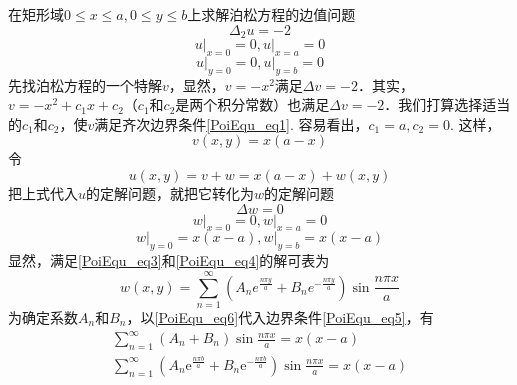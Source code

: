 \begin{example}{}
    在矩形域$0\leq x\leq a, 0\leq y\leq b$上求解泊松方程的边值问题
    \begin{equation}
        \Delta_{2} u=-2
    \end{equation}
    \begin{equation} \label{PoiEqu_eq1}
        \left.u\right|_{x=0}=0,\left.u\right|_{x=a}=0
    \end{equation}
    \begin{equation}\label{PoiEqu_eq2}
        \left.u\right|_{y=0}=0,\left.u\right|_{y=b}=0
    \end{equation}
    先找泊松方程的一个特解$v$，显然，$v=-x^2$满足$\Delta v =-2$．其实，$v=-x^2+c_1x+c_2$（$c_1$和$c_2$是两个积分常数）也满足$\Delta v = -2$．我们打算选择适当的$c_1$和$c_2$，使$v$满足齐次边界条件\autoref{PoiEqu_eq1}. 容易看出，$c_1=a,c_2 = 0$.
    这样，
    \begin{equation}
        v(x,y) = x(a-x)
    \end{equation}
    令
    \begin{equation}
        u(x,y)=v+w=x(a-x)+w(x,y)
    \end{equation}
    把上式代入$u$的定解问题，就把它转化为$w $的定解问题
    \begin{equation} \label{PoiEqu_eq3}
        \Delta w =0
    \end{equation}
    \begin{equation} \label{PoiEqu_eq4}
        \left.w\right|_{x=0}=0,\left.w\right|_{x=a}=0
    \end{equation}
    \begin{equation} \label{PoiEqu_eq5}
        \left.w\right|_{y=0}=x(x-a),\left.w\right|_{y=b}=x(x-a)
    \end{equation}
    显然，满足\autoref{PoiEqu_eq3}和\autoref{PoiEqu_eq4}的解可表为
    \begin{equation} \label{PoiEqu_eq6}
        w(x, y)=\sum_{n=1}^{\infty}\left(A_{n} e^{\frac{n \pi y}{a}}+B_{n} e^{-\frac{n \pi y}{a}}\right) \sin \frac{n \pi x}{a}
    \end{equation}
    为确定系数$A_n$和$B_n$，以\autoref{PoiEqu_eq6}代入边界条件\autoref{PoiEqu_eq5}，有
    \begin{equation}  \label{PoiEqu_eq7}
        \begin{array}{l}\sum_{n=1}^{\infty}\left(A_{n}+B_{n}\right) \sin \frac{n \pi x}{a}=x(x-a) \\ \sum_{n=1}^{\infty}\left(A_{n} \mathrm{e}^{\frac{n \pi b}{a}}+B_{n} \mathrm{e}^{-\frac{n \pi b}{a}}\right) \sin \frac{n \pi x}{a}=x(x-a)\end{array}

\end{equation}
\end{example}

